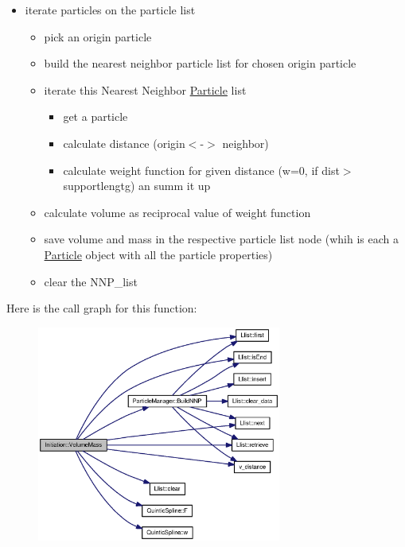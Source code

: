 \begin{itemize}
\item iterate particles on the particle list

\begin{itemize}
\item pick an origin particle

\item build the nearest neighbor particle list for chosen origin particle

\item iterate this Nearest Neighbor \hyperlink{classParticle}{Particle} list

\begin{itemize}
\item get a particle

\item calculate distance (origin$<$-$>$ neighbor)

\item calculate weight function for given distance (w=0, if dist$>$supportlengtg) an summ it up \end{itemize}


\item calculate volume as reciprocal value of weight function

\item save volume and mass in the respective particle list node (whih is each a \hyperlink{classParticle}{Particle} object with all the particle properties)

\item clear the NNP\_\-list\end{itemize}
\end{itemize}


Here is the call graph for this function:\nopagebreak
\begin{figure}[H]
\begin{center}
\leavevmode
\includegraphics[width=227pt]{classInitiation_e80adc7d2105ad67b766fd1127966df3_cgraph}
\end{center}
\end{figure}


